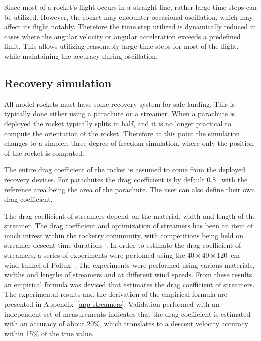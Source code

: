Since most of a rocket's flight occurs in a straight line, rather
large time steps can be utilized.  However, the rocket may encounter
occasional oscillation, which may affect its flight notably.
Therefore the time step utilized is dynamically reduced in cases where
the angular velocity or angular acceleration exceeds a predefined
limit.  This allows utilizing reasonably large time steps for most of
the flight, while maintaining the accuracy during oscillation.


\subsection{Recovery simulation}

All model rockets must have some recovery system for safe landing.
This is typically done either using a parachute or a streamer.  When a
parachute is deployed the rocket typically splits in half, and it is
no longer practical to compute the orientation of the rocket.
Therefore at this point the simulation changes to a simpler, three
degree of freedom simulation, where only the position of the rocket is
computed.

The entire drag coefficient of the rocket is assumed to come from the
deployed recovery devices.  For parachutes the drag coefficient is
by default 0.8~\cite[p.~13-23]{hoerner} with the reference area being the
area of the parachute.  The user can also define their own drag
coefficient.

The drag coefficient of streamers depend on the material, width and
length of the streamer.  The drag coefficient and optimization of
streamers has been an item of much intrest within the rocketry
community, with competitions being held on streamer descent time
durations~\cite{streamer-optimization}.  In order to estimate the drag
coefficient of streamers, a series of experiments were perfomed using
the $40\times40\times120$~cm wind tunnel of
Pollux~\cite{pollux-wind-tunnel}.  The experiments were performed
using various materials, widths and lengths of streamers and at
different wind speeds.  From these results an empirical formula was
devised that estimates the drag coefficient of streamers.  The
experimental results and the derivation of the empirical formula are
presented in Appendix~\ref{app-streamers}.  Validation performed with
an independent set of measurements indicates that the drag coefficient
is estimated with an accuracy of about 20\%, which translates to a
descent velocity accuracy within 15\% of the true value.




